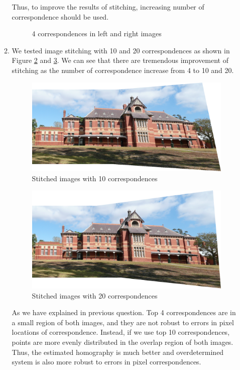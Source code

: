 \documentclass[12pt]{article}
\begin{document}
\begin{enumerate}
\begin{enumerate}
	Thus, to improve the results of stitching, increasing number of correspondence should be used. 
	\begin{figure}[H]
		\centering
		\caption{4 correspondences in left and right images}
		\label{fig: 1c_corr}
	\end{figure}

\item We tested image stitching with 10 and 20 correspondences as shown in Figure \ref{fig 1c10} and \ref{fig 1c20}. We can see that there are tremendous improvement of stitching as the number of correspondence increase from 4 to 10 and 20.
\begin{figure}[H]
	\centering
	\includegraphics[width=\textwidth]{stitched_image_10pts}
	\caption{Stitched images with 10 correspondences}
	\label{fig 1c10}
\end{figure}
\begin{figure}[H]
	\centering
	\includegraphics[width=\textwidth]{stitched_image_20pts}
	\caption{Stitched images with 20 correspondences}
	\label{fig 1c20}
\end{figure}
As we have explained in previous question. Top 4 correspondences are in a small region of both images, and they are not robust to errors in pixel locations of correspondence. Instead, if we use top 10 correspondences, points are more evenly distributed in the overlap region of both images. Thus, the estimated homography is much better and overdetermined system is also more robust to errors in pixel correspondences.\\

\end{enumerate}
\end{enumerate}
\end{document}
